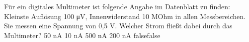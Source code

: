     {Für ein digitales Multimeter ist folgende Angabe im Datenblatt zu finden: Kleinste Auflösung 100 μV, Innenwiderstand 10 MOhm in allen Messbereichen. Sie messen eine Spannung von 0,5 V. Welcher Strom fließt dabei durch das Multimeter?}
    {50 nA}
    {10 nA}
    {500 nA}
    {200 nA}
    {false}{false}